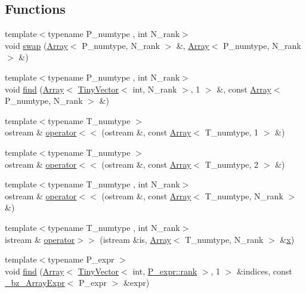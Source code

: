 \subsection*{Functions}
\begin{DoxyCompactItemize}
\item 
{\footnotesize template$<$typename P\+\_\+numtype , int N\+\_\+rank$>$ }\\void \hyperlink{array-impl_8h_a8483fb33f01b49fbcbe388ca8f4c46ec}{swap} (\hyperlink{classArray}{Array}$<$ P\+\_\+numtype, N\+\_\+rank $>$ \&, \hyperlink{classArray}{Array}$<$ P\+\_\+numtype, N\+\_\+rank $>$ \&)
\item 
{\footnotesize template$<$typename P\+\_\+numtype , int N\+\_\+rank$>$ }\\void \hyperlink{array-impl_8h_a0af5a49edd7753a60ebae7174743d899}{find} (\hyperlink{classArray}{Array}$<$ \hyperlink{classTinyVector}{Tiny\+Vector}$<$ int, N\+\_\+rank $>$, 1 $>$ \&, const \hyperlink{classArray}{Array}$<$ P\+\_\+numtype, N\+\_\+rank $>$ \&)
\item 
{\footnotesize template$<$typename T\+\_\+numtype $>$ }\\ostream \& \hyperlink{array-impl_8h_a761cf2ddb4c0a2d11d3e66905be07dbe}{operator$<$$<$} (ostream \&, const \hyperlink{classArray}{Array}$<$ T\+\_\+numtype, 1 $>$ \&)
\item 
{\footnotesize template$<$typename T\+\_\+numtype $>$ }\\ostream \& \hyperlink{array-impl_8h_a29a7ebfc237e3ec1d996ad0fa87dd945}{operator$<$$<$} (ostream \&, const \hyperlink{classArray}{Array}$<$ T\+\_\+numtype, 2 $>$ \&)
\item 
{\footnotesize template$<$typename T\+\_\+numtype , int N\+\_\+rank$>$ }\\ostream \& \hyperlink{array-impl_8h_ac94be81fda55e0a2474fb744fcf0df5b}{operator$<$$<$} (ostream \&, const \hyperlink{classArray}{Array}$<$ T\+\_\+numtype, N\+\_\+rank $>$ \&)
\item 
{\footnotesize template$<$typename T\+\_\+numtype , int N\+\_\+rank$>$ }\\istream \& \hyperlink{array-impl_8h_ad8522755e6ee07b8d8b1f7708afddca5}{operator$>$$>$} (istream \&is, \hyperlink{classArray}{Array}$<$ T\+\_\+numtype, N\+\_\+rank $>$ \&\hyperlink{vecnorm1_8cc_ac73eed9e41ec09d58f112f06c2d6cb63}{x})
\item 
{\footnotesize template$<$typename P\+\_\+expr $>$ }\\void \hyperlink{array-impl_8h_ad11d57daf4b0db08c441230c60d382be}{find} (\hyperlink{classArray}{Array}$<$ \hyperlink{classTinyVector}{Tiny\+Vector}$<$ int, \hyperlink{zfftnd_8c_a6cfd95afd0afebd625b889fb6e58371c}{P\+\_\+expr\+::rank} $>$, 1 $>$ \&indices, const \hyperlink{class__bz__ArrayExpr}{\+\_\+bz\+\_\+\+Array\+Expr}$<$ P\+\_\+expr $>$ \&expr)
\end{DoxyCompactItemize}
